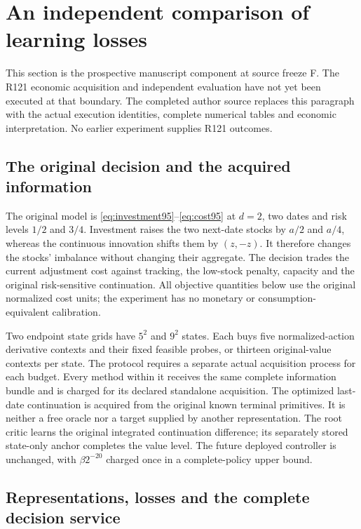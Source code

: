 \section{An independent comparison of learning losses}
\label{sec:numerical121}

This section is the prospective manuscript component at source freeze F.
The R121 economic acquisition and independent evaluation have not yet been
executed at that boundary. The completed author source replaces this paragraph
with the actual execution identities, complete numerical tables and economic
interpretation. No earlier experiment supplies R121 outcomes.

\subsection{The original decision and the acquired information}
\label{subsec:design121}

The original model is \eqref{eq:investment95}--\eqref{eq:cost95} at $d=2$,
two dates and risk levels $1/2$ and $3/4$. Investment raises the two next-date
stocks by $a/2$ and $a/4$, whereas the continuous innovation shifts them by
$(z,-z)$. It therefore changes the stocks' imbalance without changing their
aggregate. The decision trades the current adjustment cost against tracking,
the low-stock penalty, capacity and the original risk-sensitive continuation.
All objective quantities below use the original normalized cost units; the
experiment has no monetary or consumption-equivalent calibration.

Two endpoint state grids have
$5^2$ and $9^2$ states. Each buys five normalized-action derivative contexts
and their fixed feasible probes, or thirteen original-value contexts per
state. The protocol requires a separate actual acquisition process for each
budget. Every method
within it receives the same complete information bundle and is charged for
its declared standalone acquisition. The optimized last-date continuation is
acquired from the original known terminal primitives. It is neither a free
oracle nor a target supplied by another representation. The root critic learns
the original integrated continuation difference; its separately stored
state-only anchor completes the value level. The future deployed controller
is unchanged, with $\beta 2^{-20}$ charged once in a complete-policy upper
bound.

\subsection{Representations, losses and the complete decision service}
\label{subsec:methods121}

